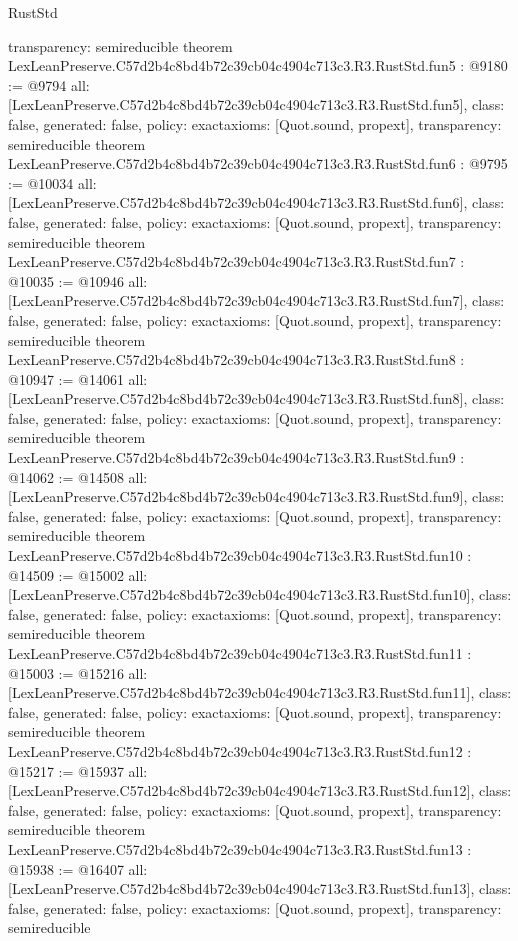 \begin{lexlean}{RustStd}
\begin{coremodule}
{  transparency: semireducible
}
theorem LexLeanPreserve.C57d2b4c8bd4b72c39cb04c4904c713c3.R3.RustStd.fun5 : @9180 := @9794 {
  all: [LexLeanPreserve.C57d2b4c8bd4b72c39cb04c4904c713c3.R3.RustStd.fun5],
  class: false,
  generated: false,
  policy: exact{axioms: [Quot.sound, propext]},
  transparency: semireducible
}
theorem LexLeanPreserve.C57d2b4c8bd4b72c39cb04c4904c713c3.R3.RustStd.fun6 : @9795 := @10034 {
  all: [LexLeanPreserve.C57d2b4c8bd4b72c39cb04c4904c713c3.R3.RustStd.fun6],
  class: false,
  generated: false,
  policy: exact{axioms: [Quot.sound, propext]},
  transparency: semireducible
}
theorem LexLeanPreserve.C57d2b4c8bd4b72c39cb04c4904c713c3.R3.RustStd.fun7 : @10035 := @10946 {
  all: [LexLeanPreserve.C57d2b4c8bd4b72c39cb04c4904c713c3.R3.RustStd.fun7],
  class: false,
  generated: false,
  policy: exact{axioms: [Quot.sound, propext]},
  transparency: semireducible
}
theorem LexLeanPreserve.C57d2b4c8bd4b72c39cb04c4904c713c3.R3.RustStd.fun8 : @10947 := @14061 {
  all: [LexLeanPreserve.C57d2b4c8bd4b72c39cb04c4904c713c3.R3.RustStd.fun8],
  class: false,
  generated: false,
  policy: exact{axioms: [Quot.sound, propext]},
  transparency: semireducible
}
theorem LexLeanPreserve.C57d2b4c8bd4b72c39cb04c4904c713c3.R3.RustStd.fun9 : @14062 := @14508 {
  all: [LexLeanPreserve.C57d2b4c8bd4b72c39cb04c4904c713c3.R3.RustStd.fun9],
  class: false,
  generated: false,
  policy: exact{axioms: [Quot.sound, propext]},
  transparency: semireducible
}
theorem LexLeanPreserve.C57d2b4c8bd4b72c39cb04c4904c713c3.R3.RustStd.fun10 : @14509 := @15002 {
  all: [LexLeanPreserve.C57d2b4c8bd4b72c39cb04c4904c713c3.R3.RustStd.fun10],
  class: false,
  generated: false,
  policy: exact{axioms: [Quot.sound, propext]},
  transparency: semireducible
}
theorem LexLeanPreserve.C57d2b4c8bd4b72c39cb04c4904c713c3.R3.RustStd.fun11 : @15003 := @15216 {
  all: [LexLeanPreserve.C57d2b4c8bd4b72c39cb04c4904c713c3.R3.RustStd.fun11],
  class: false,
  generated: false,
  policy: exact{axioms: [Quot.sound, propext]},
  transparency: semireducible
}
theorem LexLeanPreserve.C57d2b4c8bd4b72c39cb04c4904c713c3.R3.RustStd.fun12 : @15217 := @15937 {
  all: [LexLeanPreserve.C57d2b4c8bd4b72c39cb04c4904c713c3.R3.RustStd.fun12],
  class: false,
  generated: false,
  policy: exact{axioms: [Quot.sound, propext]},
  transparency: semireducible
}
theorem LexLeanPreserve.C57d2b4c8bd4b72c39cb04c4904c713c3.R3.RustStd.fun13 : @15938 := @16407 {
  all: [LexLeanPreserve.C57d2b4c8bd4b72c39cb04c4904c713c3.R3.RustStd.fun13],
  class: false,
  generated: false,
  policy: exact{axioms: [Quot.sound, propext]},
  transparency: semireducible
}
\end{coremodule}
\end{lexlean}
